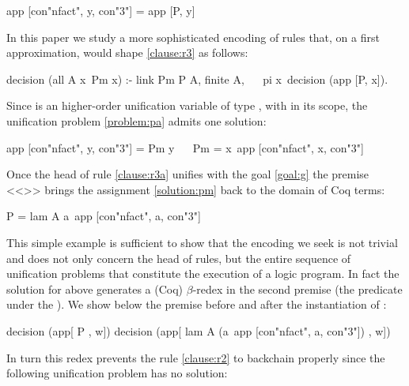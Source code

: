 \documentclass[sigconf,natbib=false,review]{acmart}
\begin{document}
\begin{elpicode}
app [con"nfact", y, con"3"] = app [P, y]               ~~
\end{elpicode}

\noindent
In this paper we study a more sophisticated encoding of rules that, on a first
approximation, would shape \ref{clause:r3} as follows:

\begin{elpicode}
decision (all A x\ Pm x) :- link Pm P A, finite A,    ~~
  pi x\ decision (app [P, x]).
\end{elpicode}

\noindent
Since  is an higher-order unification variable
of type ,
with 
in its scope, the unification problem \ref{problem:pa}
admits one solution:

\begin{elpicode}
app [con"nfact", y, con"3"] = Pm y                    ~~
Pm = x\ app [con"nfact", x, con"3"]                   ~~
\end{elpicode}

\noindent
Once the head of rule \ref{clause:r3a} unifies with the goal \ref{goal:g}
the premise <<>> brings the assignment \ref{solution:pm}
back to the domain  of Coq terms:

\begin{elpicode}
P = lam A a\ app [con"nfact", a, con"3"]
\end{elpicode}

\noindent
This simple example is sufficient to show that the encoding we seek
is not trivial and does not only concern the head of rules, but the entire sequence
of unification problems that constitute the execution of a logic program.
In fact
the solution for  above generates a
(Coq) $\beta$-redex in the second premise (the predicate
under the \hspace{-0.4em}). We show below the premise before and
after the instantiation of :

\begin{elpicode}
decision (app[                    P                   , w])
decision (app[ lam A (a\ app [con"nfact", a, con"3"]) , w])
\end{elpicode}

\noindent
In turn this redex prevents the rule \ref{clause:r2} to backchain properly since
the following unification problem has no solution:
\end{document}
